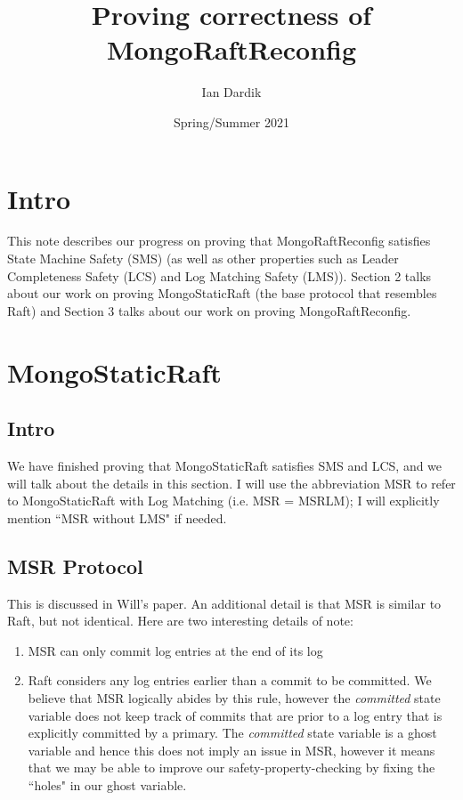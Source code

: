 \documentclass[12pt]{article}
\title{Proving correctness of MongoRaftReconfig}
\date{Spring/Summer 2021}
\author{Ian Dardik}
\begin{document}
\maketitle

\section{Intro}
This note describes our progress on proving that MongoRaftReconfig satisfies State Machine Safety (SMS) (as well as other properties such as Leader Completeness Safety (LCS) and Log Matching Safety (LMS)).  Section 2 talks about our work on proving MongoStaticRaft (the base protocol that resembles Raft) and Section 3 talks about our work on proving MongoRaftReconfig.  

\section{MongoStaticRaft}

\subsection{Intro}
We have finished proving that MongoStaticRaft satisfies SMS and LCS, and we will talk about the details in this section.  I will use the abbreviation MSR to refer to MongoStaticRaft with Log Matching (i.e. MSR = MSRLM); I will explicitly mention ``MSR without LMS" if needed.  

\subsection{MSR Protocol}
This is discussed in Will's paper.  An additional detail is that MSR is similar to Raft, but not identical.  Here are two interesting details of note:
\begin{enumerate}
	\item MSR can only commit log entries at the end of its log
	\item Raft considers any log entries earlier than a commit to be committed.  We believe that MSR logically abides by this rule, however the \textit{committed} state variable does not keep track of commits that are prior to a log entry that is explicitly committed by a primary.  The \textit{committed} state variable is a ghost variable and hence this does not imply an issue in MSR, however it means that we may be able to improve our safety-property-checking by fixing the ``holes" in our ghost variable.  
\end{enumerate}
\end{document}
